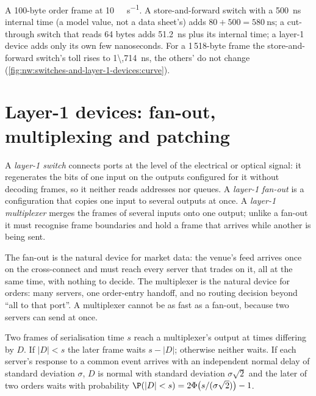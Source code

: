 \begin{example}\label{ex:nw:switches-and-layer-1-devices:order}
A 100-byte order frame at \qty{10}{\giga\bit\per\second}. A store-and-forward switch with a \qty{500}{\nano\second} internal time
(a model value, not a data sheet's) adds $80 + 500 = \qty{580}{\nano\second}$; a cut-through switch that reads 64 bytes adds
\qty{51.2}{\nano\second} plus its internal time; a layer-1 device adds only its own few nanoseconds. For a 1\,518-byte frame
the store-and-forward switch's toll rises to \qty{1\,714}{\nano\second}, the others' do not change
(\cref{fig:nw:switches-and-layer-1-devices:curve}).
\end{example}

\section{Layer-1 devices: fan-out, multiplexing and patching}

\begin{definition}\label{def:nw:switches-and-layer-1-devices:l1}
A \emph{layer-1 switch} connects ports at the level of the electrical or optical signal: it regenerates
the bits of one input on the outputs configured for it without decoding frames, so it neither reads addresses nor queues. A
\emph{layer-1 fan-out} is a configuration that copies one input to several outputs at once. A
\emph{layer-1 multiplexer} merges the frames of several inputs onto one output; unlike a fan-out it must
recognise frame boundaries and hold a frame that arrives while another is being sent.
\end{definition}

The fan-out is the natural device for market data: the venue's feed arrives once on the cross-connect and must reach every
server that trades on it, all at the same time, with nothing to decide. The multiplexer is the natural device for orders: many
servers, one order-entry handoff, and no routing decision beyond ``all to that port''. A multiplexer cannot be as fast as a fan-out,
because two servers can send at once.

\begin{proposition}\label{prop:nw:switches-and-layer-1-devices:mux}
Two frames of serialisation time $s$ reach a multiplexer's output at times differing by $D$. If $|D| < s$ the later frame waits
$s - |D|$; otherwise neither waits. If each server's response to a common event arrives with an independent normal delay of
standard deviation $\sigma$, $D$ is normal with standard deviation $\sigma\sqrt2$ and the later of two orders waits with
probability $\P(|D| < s) = 2\Phi\bigl(s/(\sigma\sqrt2)\bigr) - 1$.
\end{proposition}

